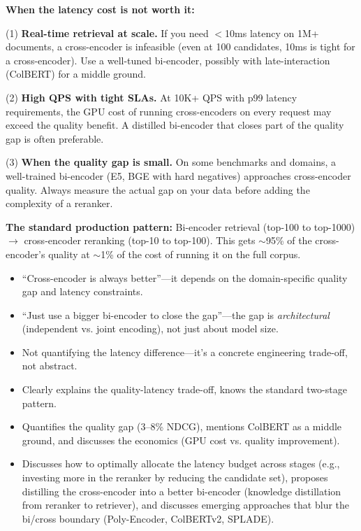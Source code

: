 \begin{interviewq}
\textbf{When the latency cost is not worth it:}

(1) \textbf{Real-time retrieval at scale.} If you need $<$10ms latency on 1M+ documents, a cross-encoder is infeasible (even at 100 candidates, 10ms is tight for a cross-encoder). Use a well-tuned bi-encoder, possibly with late-interaction (ColBERT) for a middle ground.

(2) \textbf{High QPS with tight SLAs.} At 10K+ QPS with p99 latency requirements, the GPU cost of running cross-encoders on every request may exceed the quality benefit. A distilled bi-encoder that closes part of the quality gap is often preferable.

(3) \textbf{When the quality gap is small.} On some benchmarks and domains, a well-trained bi-encoder (E5, BGE with hard negatives) approaches cross-encoder quality. Always measure the actual gap on your data before adding the complexity of a reranker.

\textbf{The standard production pattern:} Bi-encoder retrieval (top-100 to top-1000) $\to$ cross-encoder reranking (top-10 to top-100). This gets $\sim$95\% of the cross-encoder's quality at $\sim$1\% of the cost of running it on the full corpus.

\redflags
\begin{itemize}
    \item ``Cross-encoder is always better''---it depends on the domain-specific quality gap and latency constraints.
    \item ``Just use a bigger bi-encoder to close the gap''---the gap is \textit{architectural} (independent vs. joint encoding), not just about model size.
    \item Not quantifying the latency difference---it's a concrete engineering trade-off, not abstract.
\end{itemize}


\goodgreat
\begin{itemize}
    \item {} Clearly explains the quality-latency trade-off, knows the standard two-stage pattern.
    \item {} Quantifies the quality gap (3--8\% NDCG), mentions ColBERT as a middle ground, and discusses the economics (GPU cost vs. quality improvement).
    \item {} Discusses how to optimally allocate the latency budget across stages (e.g., investing more in the reranker by reducing the candidate set), proposes distilling the cross-encoder into a better bi-encoder (knowledge distillation from reranker to retriever), and discusses emerging approaches that blur the bi/cross boundary (Poly-Encoder, ColBERTv2, SPLADE).
\end{itemize}

\end{interviewq}

